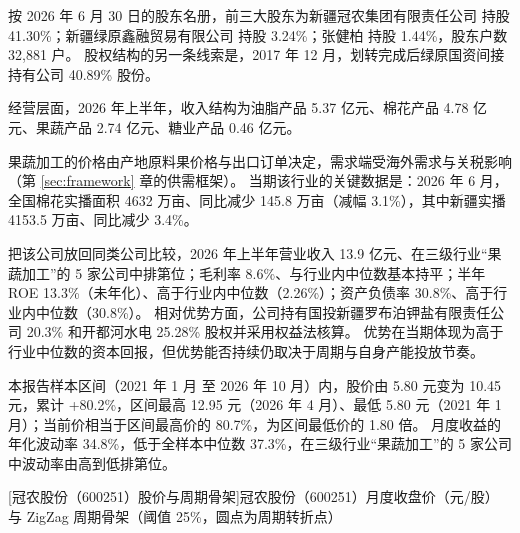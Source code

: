 按 2026 年 6 月 30 日的股东名册，前三大股东为新疆冠农集团有限责任公司 持股 41.30\%；新疆绿原鑫融贸易有限公司 持股 3.24\%；张健柏 持股 1.44\%，股东户数 32,881 户。 股权结构的另一条线索是，2017 年 12 月，划转完成后绿原国资间接持有公司 40.89\% 股份。

 经营层面，2026 年上半年，收入结构为油脂产品 5.37 亿元、棉花产品 4.78 亿元、果蔬产品 2.74 亿元、糖业产品 0.46 亿元。

 果蔬加工的价格由产地原料果价格与出口订单决定，需求端受海外需求与关税影响（第 \ref{sec:framework} 章的供需框架）。 当期该行业的关键数据是：2026 年 6 月，全国棉花实播面积 4632 万亩、同比减少 145.8 万亩（减幅 3.1\%），其中新疆实播 4153.5 万亩、同比减少 3.4\%。

 把该公司放回同类公司比较，2026 年上半年营业收入 13.9 亿元、在三级行业“果蔬加工”的 5 家公司中排第位；毛利率 8.6\%、与行业内中位数基本持平；半年 ROE 13.3\%（未年化）、高于行业内中位数（2.26\%）；资产负债率 30.8\%、高于行业内中位数（30.8\%）。 相对优势方面，公司持有国投新疆罗布泊钾盐有限责任公司 20.3\% 和开都河水电 25.28\% 股权并采用权益法核算。 优势在当期体现为高于行业中位数的资本回报，但优势能否持续仍取决于周期与自身产能投放节奏。

 本报告样本区间（2021 年 1 月 至 2026 年 10 月）内，股价由 5.80 元变为 10.45 元，累计 +80.2\%，区间最高 12.95 元（2026 年 4 月）、最低 5.80 元（2021 年 1 月）；当前价相当于区间最高价的 80.7\%，为区间最低价的 1.80 倍。 月度收益的年化波动率 34.8\%，低于全样本中位数 37.3\%，在三级行业“果蔬加工”的 5 家公司中波动率由高到低排第位。

\begin{center}
\begin{minipage}{\textwidth}\centering
{}

[冠农股份（600251）股价与周期骨架]{冠农股份（600251）月度收盘价（元/股）与 ZigZag 周期骨架（阈值 25\%，圆点为周期转折点）}
\end{minipage}
\end{center}

